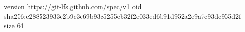 version https://git-lfs.github.com/spec/v1
oid sha256:c288523933e2b9c3e69b93e5255eb32f2e033ed6b91d952a2e9a7c93dc955d2f
size 64
